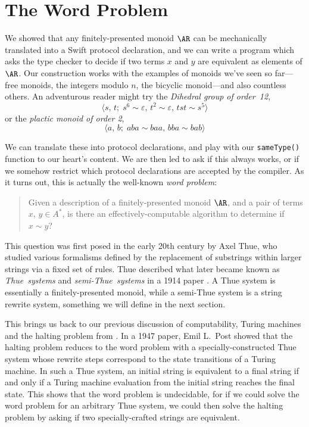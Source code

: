 \documentclass[../generics]{subfiles}
\begin{document}
\section{The Word Problem}\label{word problem}

We showed that any finitely-presented monoid $\AR$ can be mechanically translated into a Swift protocol declaration, and we can write a program which asks the type checker to decide if two terms $x$ and $y$ are equivalent as elements of $\AR$. Our construction works with the examples of monoids we've seen so far---free monoids, the integers modulo $n$, the bicyclic monoid---and also countless others. An adventurous reader might try the \emph{Dihedral group of order~12},
\[\langle s,\,t;\; s^6\sim\varepsilon,\, t^2\sim\varepsilon,\, tst\sim s^5\rangle\]
or the \emph{plactic monoid of order 2},
\[\langle a,\,b;\; aba\sim baa,\, bba\sim bab\rangle\]

We can translate these into protocol declarations, and play with our \texttt{sameType()} function to our heart's content. We are then led to ask if this always works, or if we somehow restrict which protocol declarations are accepted by the compiler. As it turns out, this is actually the well-known \emph{word problem}:
\begin{quote}
Given a description of a finitely-presented monoid $\AR$, and a pair of terms $x$, $y\in A^*$, is there an effectively-computable algorithm to determine if $x\sim y$?
\end{quote}

This question was first posed in the early 20th century by Axel Thue, who studied various formalisms defined by the replacement of substrings within larger strings via a fixed set of rules. Thue described what later became known as \emph{Thue~systems} and \emph{semi-Thue~systems} in a 1914 paper \cite{thue_translation}. A Thue system is essentially a finitely-presented monoid, while a semi-Thue system is a string rewrite system, something we will define in the next section.

This brings us back to our previous discussion of computability, Turing machines and the halting problem from . In a 1947 paper, Emil L.~Post showed that the halting problem reduces to the word problem with a specially-constructed Thue system whose rewrite steps correspond to the state transitions of a Turing machine. In such a Thue system, an initial string is equivalent to a final string if and only if a Turing machine evaluation from the initial string reaches the final state. This shows that the word problem is undecidable, for if we could solve the word problem for an arbitrary Thue system, we could then solve the halting problem by asking if two specially-crafted strings are equivalent.
\end{document}
